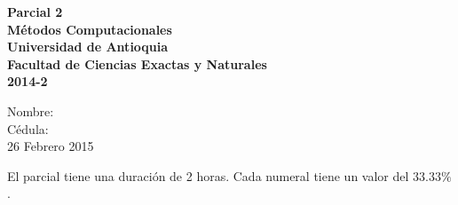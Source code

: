 \documentclass[a4,useAMS,usenatbib,usegraphicx,12pt]{article}
\begin{document}
\begin{flushleft}
  \sffamily\bfseries
  {\Large Parcial 2\hspace{5cm}}\LOGO\\
  Métodos Computacionales \\
  Universidad de Antioquia\\
  Facultad de Ciencias Exactas y Naturales\\  
  2014-2\\
  
\hrulefill\par

  Nombre: \\
  Cédula: \\
  \footnotesize 26 Febrero 2015

\hrulefill\par
  
  \end{flushleft}



El parcial tiene una duración de 2 horas. Cada numeral tiene un valor del $33.33\%$.
\end{document}
